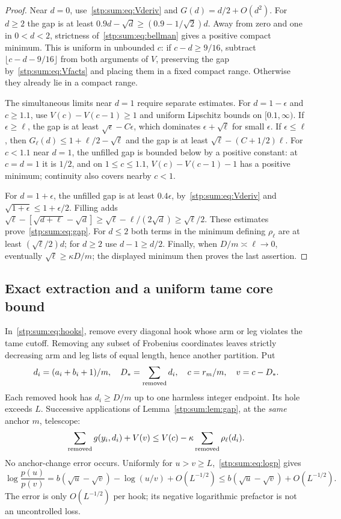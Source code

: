 \documentclass[11pt]{article}
\theoremstyle{remark}\newtheorem{remark}[theorem]{Remark}
\begin{document}
\begin{proof}
Near $d=0$, use~\eqref{stp:sum:eq:Vderiv} and $G(d)=d/2+O(d^2)$. For $d\ge2$ the gap is at least $0.9d-\sqrt d\ge(0.9-1/\sqrt2)d$. Away from zero and one in $0<d<2$, strictness of~\eqref{stp:sum:eq:bellman} gives a positive compact minimum. This is uniform in unbounded $c$: if $c-d\ge9/16$, subtract $\lfloor c-d-9/16\rfloor$ from both arguments of $V$, preserving the gap by~\eqref{stp:sum:eq:Vfacts} and placing them in a fixed compact range. Otherwise they already lie in a compact range.

The simultaneous limits near $d=1$ require separate estimates. For $d=1-\epsilon$ and $c\ge1.1$, use $V(c)-V(c-1)\ge1$ and uniform Lipschitz bounds on $[0.1,\infty)$. If $\epsilon\ge\ell$, the gap is at least $\sqrt\epsilon-C\epsilon$, which dominates $\epsilon+\sqrt\ell$ for small $\epsilon$. If $\epsilon\le\ell$, then $G_\ell(d)\le1+\ell/2-\sqrt\ell$ and the gap is at least $\sqrt\ell-(C+1/2)\ell$. For $c<1.1$ near $d=1$, the unfilled gap is bounded below by a positive constant: at $c=d=1$ it is $1/2$, and on $1\le c\le1.1$, $V(c)-V(c-1)-1$ has a positive minimum; continuity also covers nearby $c<1$.

For $d=1+\epsilon$, the unfilled gap is at least $0.4\epsilon$, by~\eqref{stp:sum:eq:Vderiv} and $\sqrt{1+\epsilon}\le1+\epsilon/2$. Filling adds
$\sqrt\ell-[\sqrt{d+\ell}-\sqrt d]\ge\sqrt\ell-\ell/(2\sqrt d)\ge\sqrt\ell/2$.
These estimates prove~\eqref{stp:sum:eq:gap}. For $d\le2$ both terms in the minimum defining $\rho_\ell$ are at least $(\sqrt\ell/2)d$; for $d\ge2$ use $d-1\ge d/2$. Finally, when $D/m\asymp\ell\to0$, eventually $\sqrt\ell\ge\kappa D/m$; the displayed minimum then proves the last assertion.
\end{proof}

\subsection{Exact extraction and a uniform tame core bound}
In~\eqref{stp:sum:eq:hooks}, remove every diagonal hook whose arm or leg violates the tame cutoff. Removing any subset of Frobenius coordinates leaves strictly decreasing arm and leg lists of equal length, hence another partition. Put
\[
 d_i=(a_i+b_i+1)/m,\quad D_*=\sum_{\rm removed}d_i,
 \quad c=r_m/m,\quad v=c-D_*.
\]
Each removed hook has $d_i\ge D/m$ up to one harmless integer endpoint. Its hole exceeds $L$. Successive applications of Lemma~\ref{stp:sum:lem:gap}, at the \emph{same} anchor $m$, telescope:
\begin{equation}\label{stp:sum:eq:telescope}
 \sum_{\rm removed}g(y_i,d_i)+V(v)
 \le V(c)-\kappa\sum_{\rm removed}\rho_\ell(d_i).
\end{equation}
No anchor-change error occurs. Uniformly for $u>v\ge L$,~\eqref{stp:sum:eq:logp} gives
\[
 \log\frac{p(u)}{p(v)}
 =b(\sqrt u-\sqrt v)-\log(u/v)+O(L^{-1/2})
 \le b(\sqrt u-\sqrt v)+O(L^{-1/2}).
\]
The error is only $O(L^{-1/2})$ per hook; its negative logarithmic prefactor is not an uncontrolled loss.
\end{document}
